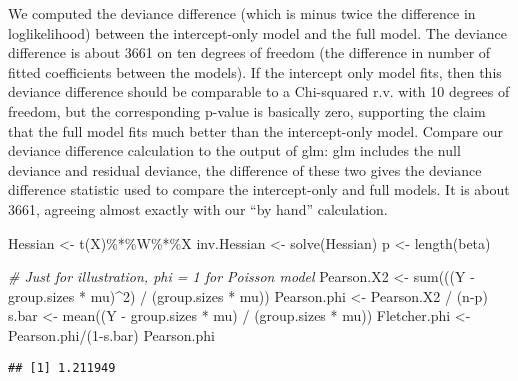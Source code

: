 \documentclass[
]{book}
\newenvironment{Shaded}{\begin{snugshade}}{\end{snugshade}}
\newcommand{\CommentTok}[1]{\textcolor[rgb]{0.56,0.35,0.01}{\textit{#1}}}
\newcommand{\DecValTok}[1]{\textcolor[rgb]{0.00,0.00,0.81}{#1}}
\newcommand{\FunctionTok}[1]{\textcolor[rgb]{0.00,0.00,0.00}{#1}}
\newcommand{\NormalTok}[1]{#1}
\newcommand{\OtherTok}[1]{\textcolor[rgb]{0.56,0.35,0.01}{#1}}
\newcommand{\SpecialCharTok}[1]{\textcolor[rgb]{0.00,0.00,0.00}{#1}}
\begin{document}
We computed the deviance difference (which is minus twice the difference in loglikelihood) between the intercept-only model and the full model. The deviance difference is about 3661 on ten degrees of freedom (the difference in number of fitted coefficients between the models). If the intercept only model fits, then this deviance difference should be comparable to a Chi-squared r.v. with 10 degrees of freedom, but the corresponding p-value is basically zero, supporting the claim that the full model fits much better than the intercept-only model. Compare our deviance difference calculation to the output of glm: glm includes the null deviance and residual deviance, the difference of these two gives the deviance difference statistic used to compare the intercept-only and full models. It is about 3661, agreeing almost exactly with our ``by hand'' calculation.

\begin{Shaded}
\begin{Highlighting}[]
\NormalTok{Hessian }\OtherTok{\textless{}{-}} \FunctionTok{t}\NormalTok{(X)}\SpecialCharTok{\%*\%}\NormalTok{W}\SpecialCharTok{\%*\%}\NormalTok{X}
\NormalTok{inv.Hessian }\OtherTok{\textless{}{-}} \FunctionTok{solve}\NormalTok{(Hessian)}
\NormalTok{p }\OtherTok{\textless{}{-}} \FunctionTok{length}\NormalTok{(beta)}

\CommentTok{\# Just for illustration, phi = 1 for Poisson model}
\NormalTok{Pearson.X2 }\OtherTok{\textless{}{-}} \FunctionTok{sum}\NormalTok{(((Y }\SpecialCharTok{{-}}\NormalTok{ group.sizes }\SpecialCharTok{*}\NormalTok{ mu)}\SpecialCharTok{\^{}}\DecValTok{2}\NormalTok{) }\SpecialCharTok{/}\NormalTok{ (group.sizes }\SpecialCharTok{*}\NormalTok{ mu))}
\NormalTok{Pearson.phi }\OtherTok{\textless{}{-}}\NormalTok{ Pearson.X2 }\SpecialCharTok{/}\NormalTok{ (n}\SpecialCharTok{{-}}\NormalTok{p)}
\NormalTok{s.bar }\OtherTok{\textless{}{-}} \FunctionTok{mean}\NormalTok{((Y }\SpecialCharTok{{-}}\NormalTok{ group.sizes }\SpecialCharTok{*}\NormalTok{ mu) }\SpecialCharTok{/}\NormalTok{ (group.sizes }\SpecialCharTok{*}\NormalTok{ mu))}
\NormalTok{Fletcher.phi }\OtherTok{\textless{}{-}}\NormalTok{ Pearson.phi}\SpecialCharTok{/}\NormalTok{(}\DecValTok{1}\SpecialCharTok{{-}}\NormalTok{s.bar)}
\NormalTok{Pearson.phi }
\end{Highlighting}
\end{Shaded}

\begin{verbatim}
## [1] 1.211949
\end{verbatim}
\end{document}
